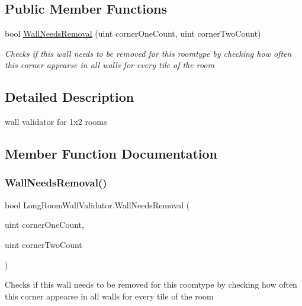 \subsection*{Public Member Functions}
\begin{DoxyCompactItemize}
\item 
bool \mbox{\hyperlink{class_long_room_wall_validator_a552c1bbadec7bc3ab93a3fae2e512ebe}{Wall\+Needs\+Removal}} (uint corner\+One\+Count, uint corner\+Two\+Count)
\begin{DoxyCompactList}\small\item\em Checks if this wall needs to be removed for this roomtype by checking how often this corner appearse in all walls for every tile of the room \end{DoxyCompactList}\end{DoxyCompactItemize}


\subsection{Detailed Description}
wall validator for 1x2 rooms 



\subsection{Member Function Documentation}
\mbox{\label{class_long_room_wall_validator_a552c1bbadec7bc3ab93a3fae2e512ebe}} 
\subsubsection{\texorpdfstring{Wall\+Needs\+Removal()}{WallNeedsRemoval()}}
{\footnotesize\ttfamily bool Long\+Room\+Wall\+Validator.\+Wall\+Needs\+Removal (\begin{DoxyParamCaption}\item[{uint}]{corner\+One\+Count,  }\item[{uint}]{corner\+Two\+Count }\end{DoxyParamCaption})}



Checks if this wall needs to be removed for this roomtype by checking how often this corner appearse in all walls for every tile of the room 

